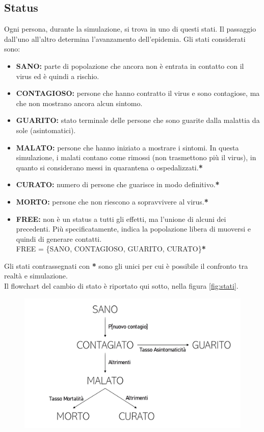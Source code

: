 \documentclass[a4paper, 12pt]{article}
\begin{document}
	\subsection{Status}
		Ogni persona, durante la simulazione, si trova in uno di questi stati. Il passaggio dall'uno all'altro determina l'avanzamento dell'epidemia.
		Gli stati considerati sono: 
		
		\begin{itemize}
			\item \textbf{SANO:} parte di popolazione che ancora non è entrata in contatto con il virus ed è quindi a rischio.
			\item \textbf{CONTAGIOSO:} persone che hanno contratto il virus e sono contagiose, ma che non mostrano ancora alcun sintomo.
			\item \textbf{GUARITO:} stato terminale delle persone che sono guarite dalla malattia da sole (asintomatici).
			\item \textbf{MALATO:} persone che hanno iniziato a mostrare i sintomi.
			In questa simulazione, i malati contano come rimossi (non trasmettono più il virus), in quanto si considerano messi in quarantena o ospedalizzati.\textbf{*}
			\item \textbf{CURATO:} numero di persone che guarisce in modo definitivo.\textbf{*}
			\item \textbf{MORTO:} persone che non riescono a sopravvivere al virus.\textbf{*}
			\item \textbf{FREE:} non è un status a tutti gli effetti, ma l'unione di alcuni dei precedenti. Più specificatamente, indica la popolazione libera di muoversi e quindi di generare contatti.\\
			FREE = \{SANO, CONTAGIOSO, GUARITO, CURATO\}\textbf{*}
		\end{itemize}
		Gli stati contrassegnati con \textbf{*} sono gli unici  per cui è possibile il confronto tra realtà e simulazione.\\
		Il flowchart del cambio di stato è riportato qui sotto, nella figura \vref{fig:stati}.
		
		 \begin{figure}[H]
		 	\centering
		 	\includegraphics[width=1\textwidth]{IMG/FlowchartStatus.png}
		 	\caption[Cambio di stato]{}
		 	\label{fig:stati}
		 \end{figure}
\end{document}
